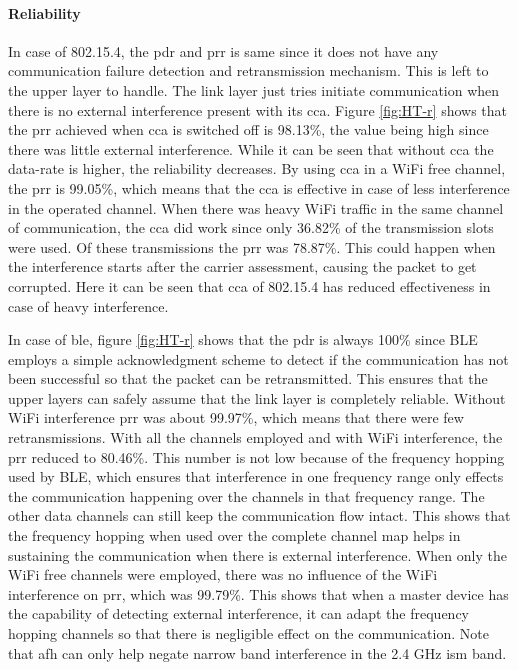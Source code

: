 \paragraph{Reliability}
In case of 802.15.4, the \gls{pdr} and \gls{prr} is same since it does not have any communication failure detection and retransmission mechanism. This is left to the upper layer to handle. The link layer just tries initiate communication when there is no external interference present with its \gls{cca}. Figure \ref{fig:HT-r} shows that the \gls{prr} achieved when \gls{cca} is switched off is 98.13\%, the value being high since there was little external interference. While it can be seen that without \gls{cca} the data-rate is higher, the reliability decreases. By using \gls{cca} in a WiFi free channel, the \gls{prr} is 99.05\%, which means that the \gls{cca} is effective in case of less interference in the operated channel. When there was heavy WiFi traffic in the same channel of communication, the \gls{cca} did work since only 36.82\% of the transmission slots were used. Of these transmissions the \gls{prr} was 78.87\%. This could happen when the interference starts after the carrier assessment, causing the packet to get corrupted. Here it can be seen that \gls{cca} of 802.15.4 has reduced effectiveness in case of heavy interference.

In case of \gls{ble}, figure \ref{fig:HT-r} shows that the \gls{pdr} is always 100\% since BLE employs a simple acknowledgment scheme to detect if the communication has not been successful so that the packet can be retransmitted. This ensures that the upper layers can safely assume that the link layer is completely reliable. Without WiFi interference \gls{prr} was about 99.97\%, which means that there were few retransmissions. With all the channels employed and with WiFi interference, the \gls{prr} reduced to 80.46\%. This number is not low because of the frequency hopping used by BLE, which ensures that interference in one frequency range only effects the communication happening over the channels in that frequency range. The other data channels can still keep the communication flow intact. This shows that the frequency hopping when used over the complete channel map helps in sustaining the communication when there is external interference. When only the WiFi free channels were employed, there was no influence of the WiFi interference on \gls{prr}, which was 99.79\%. This shows that when a master device has the capability of detecting external interference, it can adapt the frequency hopping channels so that there is negligible effect on the communication. Note that \gls{afh} can only help negate narrow band interference in the 2.4 GHz \gls{ism} band.

